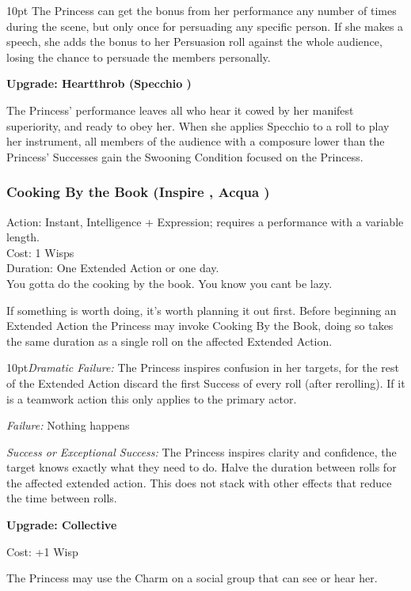 \begin{myindentpar}{10pt}
The Princess can get the bonus from her performance any number of times during the scene, but only once for persuading any specific person. If she makes a speech, she adds the bonus to her Persuasion roll against the whole audience, losing the chance to persuade the members personally.

\textbf{Upgrade: Heartthrob (Specchio \textbullet\textbullet)}

The Princess' performance leaves all who hear it cowed by her manifest superiority, and ready to obey her. When she applies Specchio to a roll to play her instrument, all members of the audience with a composure lower than the Princess' Successes gain the Swooning Condition focused on the Princess.\end{myindentpar}


\subsubsection*{Cooking By the Book (Inspire \textbullet, Acqua \textbullet)}

\noindent Action: Instant, Intelligence + Expression; requires a performance with a variable length. \\

\noindent Cost: 1 Wisps\\

\noindent Duration: One Extended Action or one day.\\

\noindent You gotta do the cooking by the book. You know you cant be lazy.

If something is worth doing, it's worth planning it out first. Before beginning an Extended Action the Princess may invoke Cooking By the Book, doing so takes the same duration as a single roll on the affected Extended Action. 

\begin{myindentpar}{10pt}\emph{Dramatic Failure:} The Princess inspires confusion in her targets, for the rest of the Extended Action discard the first Success of every roll (after rerolling). If it is a teamwork action this only applies to the primary actor. 
 
 \emph{Failure:} Nothing happens
 
 \emph{Success or Exceptional Success:} The Princess inspires clarity and confidence, the target knows exactly what they need to do. Halve the duration between rolls for the affected extended action. This does not stack with other effects that reduce the time between rolls.
 
 \textbf{Upgrade: Collective}

\noindent Cost: +1 Wisp

The Princess may use the Charm on a social group that can see or hear her. \end{myindentpar}


